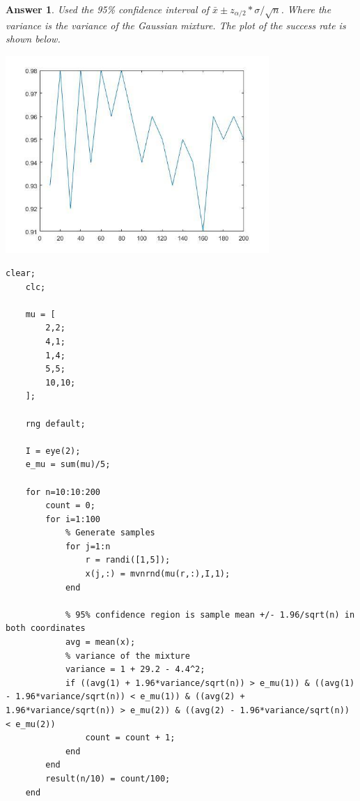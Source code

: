 \documentclass[12pt]{article}
\theoremstyle{colon}
\newtheorem*{answer}{Answer}
\begin{document}
\begin{answer}
  Used the 95\% confidence interval of $\bar{x} \pm z_{\alpha/2} * \sigma/\sqrt{n}$. Where the variance is the variance of the Gaussian mixture. The plot of the success rate is shown below.

  \begin{center}
    \includegraphics[width=10cm]{exercise8}
  \end{center}

  \begin{lstlisting}[style=Matlab-editor, basicstyle=\scriptsize]
    clear;
    clc;

    mu = [
        2,2;
        4,1;
        1,4;
        5,5;
        10,10;
    ];

    rng default;

    I = eye(2);
    e_mu = sum(mu)/5;

    for n=10:10:200
        count = 0;
        for i=1:100
            % Generate samples
            for j=1:n
                r = randi([1,5]);
                x(j,:) = mvnrnd(mu(r,:),I,1);
            end

            % 95% confidence region is sample mean +/- 1.96/sqrt(n) in both coordinates
            avg = mean(x);
            % variance of the mixture
            variance = 1 + 29.2 - 4.4^2;
            if ((avg(1) + 1.96*variance/sqrt(n)) > e_mu(1)) & ((avg(1) - 1.96*variance/sqrt(n)) < e_mu(1)) & ((avg(2) + 1.96*variance/sqrt(n)) > e_mu(2)) & ((avg(2) - 1.96*variance/sqrt(n)) < e_mu(2))
                count = count + 1;
            end
        end
        result(n/10) = count/100;
    end
  \end{lstlisting}
\end{answer}

\clearpage
\end{document}
